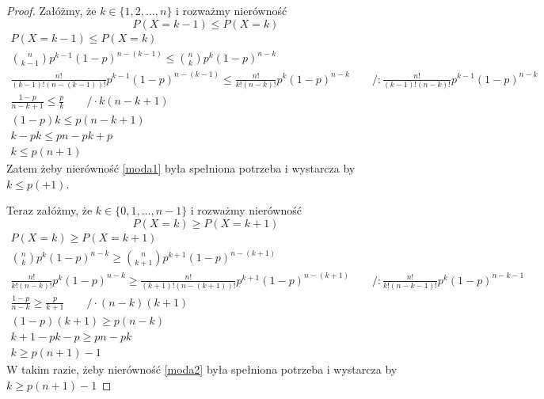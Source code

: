 \documentclass{mwart}
\begin{document}
\begin{proof}

Załóżmy, że $k\in\{1,2,\ldots,n\}$ i rozważmy nierówność 
\begin{equation}
P(X=k-1)\leq P(X=k) \label{moda1} 
\end{equation}
\begin{gather*}
P(X=k-1)\leq P(X=k) \\
{n \choose k-1}p^{k-1}(1-p)^{n-(k-1)} \leq {n \choose k}p^k(1-p)^{n-k} \\
\frac{n!}{(k-1)!(n-(k-1))!}p^{k-1}(1-p)^{n-(k-1)} \leq \frac{n!}{k!(n-k)!}p^k(1-p)^{n-k} \qquad \bigg/ :\frac{n!}{(k-1)!(n-k)!}p^{k-1}(1-p)^{n-k} \\
\frac{1-p}{n-k+1} \leq \frac{p}{k} \qquad \bigg/ \cdot k(n-k+1) \\
(1-p)k \leq p(n-k+1) \\
k-pk \leq pn-pk+p \\
k \leq p(n+1)
\end{gather*}
Zatem żeby nierówność \ref{moda1} była spełniona potrzeba i wystarcza by $k\leq p(+1)$.

Teraz załóżmy, że $k\in\{0,1, \ldots, n-1\}$ i rozważmy nierówność
\begin{equation}
P(X=k)\geq P(X=k+1) \label{moda2}
\end{equation}
\begin{gather*}
P(X=k)\geq P(X=k+1) \\
{n \choose k}p^k(1-p)^{n-k} \geq {n \choose k+1}p^{k+1}(1-p)^{n-(k+1)}  \\
\frac{n!}{k!(n-k)!}p^k(1-p)^{n-k} \geq \frac{n!}{(k+1)!(n-(k+1))!}p^{k+1}(1-p)^{n-(k+1)} \qquad \bigg/ :\frac{n!}{k!(n-k-1)!}p^k(1-p)^{n-k-1}  \\
\frac{1-p}{n-k} \geq \frac{p}{k+1} \qquad \bigg/ \cdot (n-k)(k+1) \\
(1-p)(k+1) \geq p(n-k) \\
k+1-pk-p \geq pn-pk \\
k \geq p(n+1)-1
\end{gather*}
W takim razie, żeby nierówność \ref{moda2} była spełniona potrzeba i wystarcza by $k\geq p(n+1)-1$


\end{proof}
\end{document}
